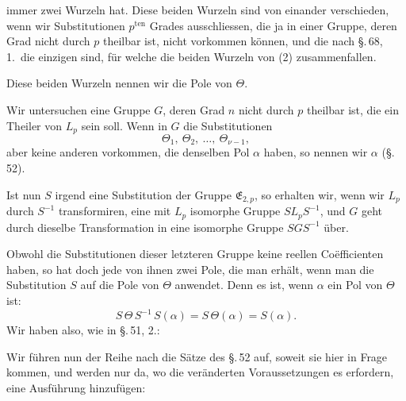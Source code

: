 immer zwei Wurzeln hat. Diese beiden Wurzeln sind von einander
verschieden, wenn wir Substitutionen $p^{\mathrm{ten}}$ Grades ausschliessen,
die ja in einer Gruppe, deren Grad nicht durch $p$ theilbar ist, nicht
vorkommen können, und die nach \S.\,68, 1.\ die einzigen sind, für welche
die beiden Wurzeln von (2) zusammenfallen.

Diese beiden Wurzeln nennen wir die Pole von $\Theta$.

Wir untersuchen eine Gruppe $G$, deren Grad $n$ nicht durch $p$
theilbar ist, die ein Theiler von $L_p$ sein soll. Wenn in $G$ die
Substitutionen
\[
\Theta_1,\ \Theta_2,\ \ldots,\ \Theta_{\nu-1},
\]
aber keine anderen vorkommen, die denselben Pol $\alpha$ haben, so
nennen wir $\alpha$  (\S.\,52).

Ist nun $S$ irgend eine Substitution der Gruppe $\mathfrak{E}_{2,p}$, so
erhalten wir, wenn wir $L_p$ durch $S^{-1}$ transformiren, eine mit $L_p$
isomorphe Gruppe $S L_p S^{-1}$, und $G$ geht durch dieselbe
Transformation in eine isomorphe Gruppe $S G S^{-1}$ über.

Obwohl die Substitutionen dieser letzteren Gruppe keine reellen
Co\"efficienten haben, so hat doch jede von ihnen zwei Pole, die man
erhält, wenn man die Substitution $S$ auf die Pole von $\Theta$
anwendet. Denn es ist, wenn $\alpha$ ein Pol von $\Theta$ ist:
\[
S\,\Theta\,S^{-1}\,S(\alpha) = S\,\Theta(\alpha) = S(\alpha).
\]
Wir haben also, wie in \S.\,51, 2.:


Wir führen nun der Reihe nach die Sätze des \S.\,52 auf, soweit sie
hier in Frage kommen, und werden nur da, wo die veränderten
Voraussetzungen es erfordern, eine Ausführung hinzufügen:

